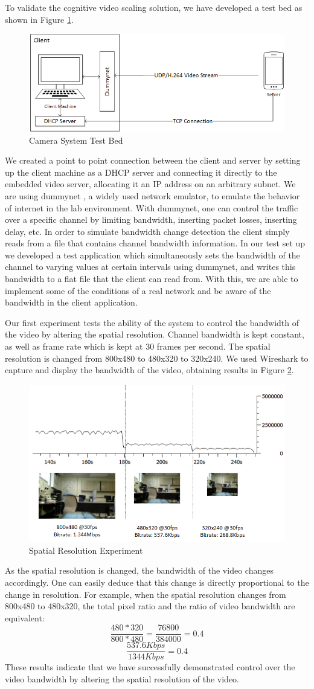 \documentclass[a4paper,12pt]{article}
\begin{document}
To validate the cognitive video scaling solution, we have developed a test bed as shown in Figure \ref{fig:Testbed}.
\begin{figure}[h]
\centering
\includegraphics[width=0.5\linewidth]{CameraSystemTestbed.png}
\caption{Camera System Test Bed}
\label{fig:Testbed}
\end{figure}
We created a point to point connection between the client and server by setting up the client machine as a DHCP server and connecting it directly to the embedded video server, allocating it an IP address on an arbitrary subnet. We are using dummynet , a widely used network emulator, to emulate the behavior of internet in the lab environment. With dummynet, one can control the traffic over a specific channel by limiting bandwidth, inserting packet losses, inserting delay, etc. In order to simulate bandwidth change detection the client simply reads from a file that contains channel bandwidth information. In our test set up we developed a test application which simultaneously sets the bandwidth of the channel to varying values at certain intervals using dummynet, and writes this bandwidth to a flat file that the client can read from. With this, we are able to implement some of the conditions of a real network and be aware of the bandwidth in the client application. 

Our first experiment tests the ability of the system to control the bandwidth of the video by altering the spatial resolution. Channel bandwidth is kept constant, as well as frame rate which is kept at 30 frames per second. The spatial resolution is changed from 800x480 to 480x320 to 320x240. We used Wireshark to capture and display the bandwidth of the video, obtaining results in Figure \ref{fig:SpatialTest}.
\begin{figure}[h]
\centering
\includegraphics[width=0.5\linewidth]{SpatialResolutionTest.png}
\caption{Spatial Resolution Experiment}
\label{fig:SpatialTest}
\end{figure}
As the spatial resolution is changed, the bandwidth of the video changes accordingly. One can easily deduce that this change is directly proportional to the change in resolution. For example, when the spatial resolution changes from 800x480 to 480x320, the total pixel ratio and the ratio of video bandwidth are equivalent:
\[ \frac{480 * 320}{800 * 480} = \frac{76800}{384000} = 0.4 \]
\[ \frac{537.6Kbps}{1344Kbps} = 0.4 \]
These results indicate that we have successfully demonstrated control over the video bandwidth by altering the spatial resolution of the video. 
\end{document}
